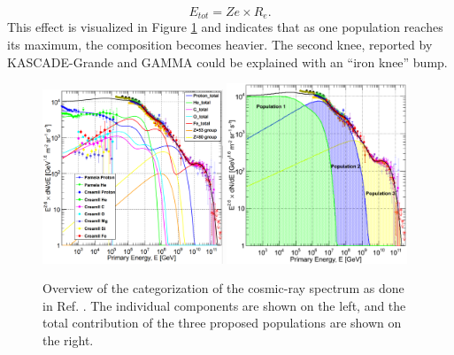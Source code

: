\begin{equation}
E_{tot} = Ze \times R_e.
\end{equation}
This effect is visualized in Figure \ref{fig:fitsgaisser} and indicates that as one population reaches its maximum, the composition becomes heavier. The second knee, reported by KASCADE-Grande \cite{Apel:2011mi} and GAMMA \cite{Garyaka:2008gs} could be explained with an ``iron knee'' bump.

\begin{figure}
\centering
\includegraphics[width=0.48\textwidth]{chapter3/img/fit1gaisser.png}
\includegraphics[width=0.48\textwidth]{chapter3/img/fit2gaisser.png}
\caption{Overview of the categorization of the cosmic-ray spectrum as done in Ref. \cite{Gaisser:2013bla}. The individual components are shown on the left, and the total contribution of the three proposed populations are shown on the right.}
\label{fig:fitsgaisser}
\end{figure}

